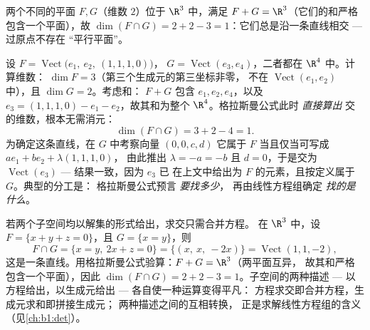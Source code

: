 \begin{example}\label{ex:b1:findim:planes}
两个不同的平面 $F, G$（维数 $2$）位于 $\R^3$ 中，满足 $F + G
= \R^3$（它们的和严格包含一个平面），故 $\dim(F \cap G) =
2 + 2 - 3 = 1$：它们总是沿一条直线相交 --- 过原点不存在
“平行平面”。
\end{example}

\begin{example}[格拉斯曼公式的应用，在 $\R^4$ 中]
\label{ex:b1:findim:grassmannrun}
设 $F = \operatorname{Vect}\bigl(e_1,\ e_2,\ (1,1,1,0)\bigr)$，
$G = \operatorname{Vect}(e_3, e_4)$，二者都在 $\R^4$ 中。计算维数：
$\dim F = 3$（第三个生成元的第三坐标非零，
不在 $\operatorname{Vect}(e_1, e_2)$ 中），且 $\dim G = 2$。考虑和：
$F + G$ 包含 $e_1, e_2, e_4$，以及 $e_3 = (1,1,1,0) - e_1 -
e_2$，故其和为整个 $\R^4$。格拉斯曼公式此时 \emph{直接算出}
交的维数，根本无需消元：
\[
\dim(F \cap G) = 3 + 2 - 4 = 1 .
\]
为确定这条直线，在 $G$ 中考察向量 $(0, 0, c, d)$
它属于 $F$ 当且仅当可写成 $a e_1 + b e_2 + \lambda(1,1,1,0)$，
由此推出 $\lambda = -a = -b$ 且 $d = 0$，于是交为
$\operatorname{Vect}(e_3)$ --- 结果一致，因为 $e_3$ 已
在上文中给出为 $F$ 的元素，且按定义属于 $G$。典型的分工是：
格拉斯曼公式预言 \emph{要找多少}，
再由线性方程组确定 \emph{找的是什么}。
\end{example}

\begin{example}[用方程求交]
\label{ex:b1:findim:intersectequations}
若两个子空间均以解集的形式给出，求交只需合并方程。
在 $\R^3$ 中，设 $F = \{x + y + z = 0\}$，且
$G = \{x = y\}$，则
\[
F \cap G = \{x = y,\ 2x + z = 0\}
= \{(x,\ x,\ -2x)\} = \operatorname{Vect}(1, 1, -2),
\]
这是一条直线。用格拉斯曼公式验算：$F + G = \R^3$（两平面互异，
故其和严格包含一个平面），因此
$\dim(F\cap G) = 2 + 2 - 3 = 1$。子空间的两种描述 ---
以方程给出，以生成元给出 --- 各自使一种运算变得平凡：
方程求交即合并方程，生成元求和即拼接生成元；
两种描述之间的互相转换，
正是求解线性方程组的含义（见\cref{ch:b1:det}）。
\end{example}

